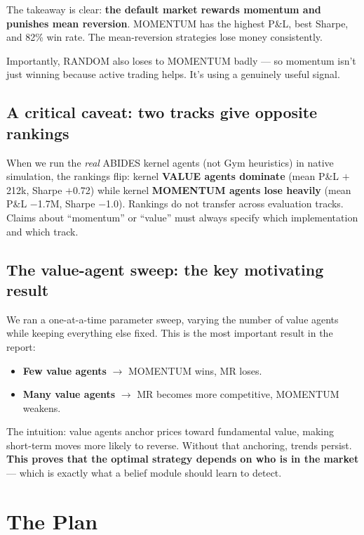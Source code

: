 \documentclass[11pt]{article}
\begin{document}
The takeaway is clear: \textbf{the default market rewards momentum and punishes mean reversion}. MOMENTUM has the highest P\&L, best Sharpe, and 82\% win rate. The mean-reversion strategies lose money consistently.

Importantly, RANDOM also loses to MOMENTUM badly --- so momentum isn't just winning because active trading helps. It's using a genuinely useful signal.

\subsection*{A critical caveat: two tracks give opposite rankings}

When we run the \textit{real} ABIDES kernel agents (not Gym heuristics) in native simulation, the rankings flip: kernel \textbf{VALUE agents dominate} (mean P\&L $+$212k, Sharpe $+$0.72) while kernel \textbf{MOMENTUM agents lose heavily} (mean P\&L $-$1.7M, Sharpe $-$1.0). Rankings do not transfer across evaluation tracks. Claims about ``momentum'' or ``value'' must always specify which implementation and which track.

\subsection*{The value-agent sweep: the key motivating result}

We ran a one-at-a-time parameter sweep, varying the number of value agents while keeping everything else fixed. This is the most important result in the report:

\begin{itemize}
    \item \textbf{Few value agents} $\rightarrow$ MOMENTUM wins, MR loses.
    \item \textbf{Many value agents} $\rightarrow$ MR becomes more competitive, MOMENTUM weakens.
\end{itemize}

The intuition: value agents anchor prices toward fundamental value, making short-term moves more likely to reverse. Without that anchoring, trends persist. \textbf{This proves that the optimal strategy depends on who is in the market} --- which is exactly what a belief module should learn to detect.

\section{The Plan}
\end{document}
